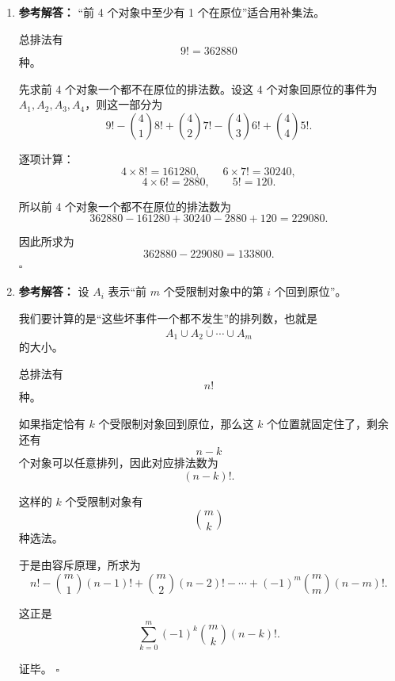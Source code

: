 \documentclass[11pt,a4paper,fontset=fandol]{ctexart}
\newenvironment{solution}{\par\noindent\textbf{参考解答：}}{\hfill$\square$\par}
\begin{document}
\begin{enumerate}
\begin{solution}
  \textbf{恰好有 7 个在原位：}
  不可能。

  \textbf{恰好有 8 个在原位：}
  有 1 种。

  所以总数为
  \[
  2464+630+112+28+1=3235.
  \]
  \end{solution}

  \item \begin{solution}
  “前 4 个对象中至少有 1 个在原位”适合用补集法。

  总排法有
  \[
  9!=362880
  \]
  种。

  先求前 4 个对象一个都不在原位的排法数。设这 4 个对象回原位的事件为 $A_1,A_2,A_3,A_4$，则这一部分为
  \[
  9!-\binom41 8!+\binom42 7!-\binom43 6!+\binom44 5!.
  \]

  逐项计算：
  \[
  4\times 8!=161280,
  \qquad
  6\times 7!=30240,
  \]
  \[
  4\times 6!=2880,
  \qquad
  5!=120.
  \]

  所以前 4 个对象一个都不在原位的排法数为
  \[
  362880-161280+30240-2880+120=229080.
  \]

  因此所求为
  \[
  362880-229080=133800.
  \]
  \end{solution}

  \item \begin{solution}
  设 $A_i$ 表示“前 $m$ 个受限制对象中的第 $i$ 个回到原位”。

  我们要计算的是“这些坏事件一个都不发生”的排列数，也就是
  \[
  \overline{A_1\cup A_2\cup \cdots\cup A_m}
  \]
  的大小。

  总排法有
  \[
  n!
  \]
  种。

  如果指定恰有 $k$ 个受限制对象回到原位，那么这 $k$ 个位置就固定住了，剩余还有
  \[
  n-k
  \]
  个对象可以任意排列，因此对应排法数为
  \[
  (n-k)!.
  \]

  这样的 $k$ 个受限制对象有
  \[
  \binom{m}{k}
  \]
  种选法。

  于是由容斥原理，所求为
  \[
  n!-\binom{m}{1}(n-1)!+\binom{m}{2}(n-2)!-\cdots+(-1)^m\binom{m}{m}(n-m)!.
  \]

  这正是
  \[
  \sum_{k=0}^{m}(-1)^k\binom{m}{k}(n-k)!.
  \]

  证毕。
  \end{solution}
\end{enumerate}
\end{document}
